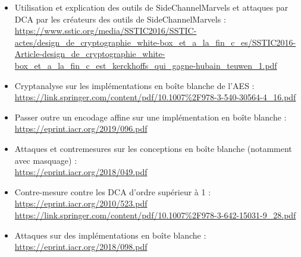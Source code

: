 \documentclass[10pt,a4paper]{article}
\begin{document}
\begin{itemize}
\item Utilisation et explication des outils de SideChannelMarvels et attaques par DCA par les créateurs des outils de SideChannelMarvels :\\
\url{https://www.sstic.org/media/SSTIC2016/SSTIC-actes/design_de_cryptographie_white-box_et_a_la_fin_c_es/SSTIC2016-Article-design_de_cryptographie_white-box_et_a_la_fin_c_est_kerckhoffs_qui_gagne-hubain_teuwen_1.pdf}\\

\item Cryptanalyse sur les implémentations en boîte blanche de l'AES :\\
\url{https://link.springer.com/content/pdf/10.1007\%2F978-3-540-30564-4_16.pdf}\\

\item Passer outre un encodage affine sur une implémentation en boîte blanche :\\
\url{https://eprint.iacr.org/2019/096.pdf}\\

\item Attaques et contremesures sur les conceptions en boîte blanche (notamment avec masquage) :\\
\url{https://eprint.iacr.org/2018/049.pdf}\\

\item Contre-mesure contre les DCA d'ordre supérieur à 1 :\\
\url{https://eprint.iacr.org/2010/523.pdf}\\
\url{https://link.springer.com/content/pdf/10.1007\%2F978-3-642-15031-9_28.pdf}\\

\item Attaques sur des implémentations en boîte blanche :\\
\url{https://eprint.iacr.org/2018/098.pdf}\\
\end{itemize}
\end{document}
